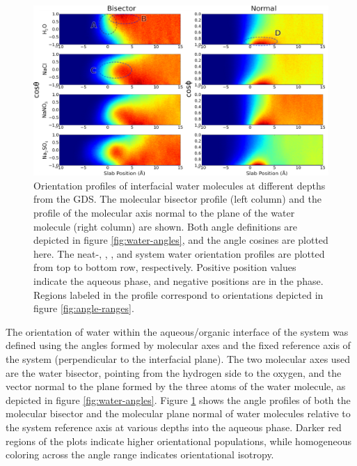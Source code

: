 \begin{figure}[h!]
\begin{center}
	\includegraphics[scale=1.0]{images/h2o-2dhistograms.png}
	\caption{Orientation profiles of interfacial water molecules at different depths from the GDS. The molecular bisector profile (left column) and the profile of the molecular axis normal to the plane of the water molecule (right column) are shown. Both angle definitions are depicted in figure \ref{fig:water-angles}, and the angle cosines are plotted here. The neat-\wat, \nacl, \sodnit, and \sodsul system water orientation profiles are plotted from top to bottom row, respectively. Positive position values indicate the aqueous phase, and negative positions are in the \ctc phase. Regions labeled in the profile correspond to orientations depicted in figure \ref{fig:angle-ranges}.}
	\label{fig:2dhisto}
\end{center}
\end{figure}

The orientation of water within the aqueous/organic interface of the system was defined using the angles formed by molecular axes and the fixed reference axis of the system (perpendicular to the interfacial plane). The two molecular axes used are the water bisector, pointing from the hydrogen side to the oxygen, and the vector normal to the plane formed by the three atoms of the water molecule, as depicted in figure \ref{fig:water-angles}. Figure \ref{fig:2dhisto} shows the angle profiles of both the molecular bisector and the molecular plane normal of water molecules relative to the system reference axis at various depths into the aqueous phase. Darker red regions of the plots indicate higher orientational populations, while homogeneous coloring across the angle range indicates orientational isotropy.

